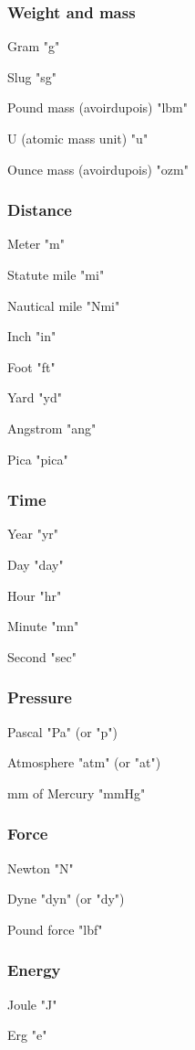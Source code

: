 \subsubsection{Weight and mass}
Gram "g" 

Slug "sg" 

Pound mass (avoirdupois) "lbm" 

U (atomic mass unit) "u" 

Ounce mass (avoirdupois) "ozm" 

\subsubsection{Distance}
Meter "m" 

Statute mile "mi" 

Nautical mile "Nmi" 

Inch "in" 

Foot "ft" 

Yard "yd" 

Angstrom "ang" 

Pica "pica" 

\subsubsection{Time}
Year "yr" 

Day "day" 

Hour "hr" 

Minute "mn" 

Second "sec" 


\subsubsection{Pressure}
Pascal "Pa" (or "p") 

Atmosphere "atm" (or "at") 

mm of Mercury "mmHg" 


\subsubsection{Force}
Newton "N" 

Dyne "dyn" (or "dy") 

Pound force "lbf" 


\subsubsection{Energy}
Joule "J" 

Erg "e" 

